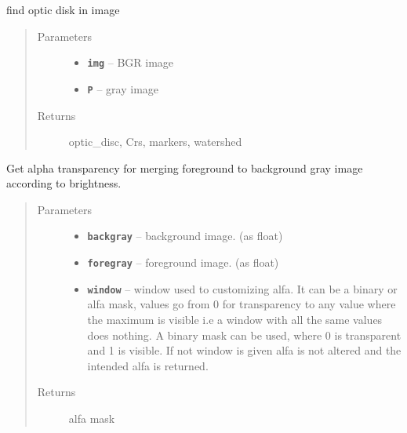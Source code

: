 \documentclass[letterpaper,10pt,english]{sphinxmanual}
\begin{document}
\begin{fulllineitems}
\label{RRtoolbox.tools:RRtoolbox.tools.segmentation.find_optic_disc}
find optic disk in image
\begin{quote}\begin{description}
\item[{Parameters}] \leavevmode\begin{itemize}
\item {} 
\textbf{\texttt{img}} -- BGR image

\item {} 
\textbf{\texttt{P}} -- gray image

\end{itemize}

\item[{Returns}] \leavevmode
optic\_disc, Crs, markers, watershed

\end{description}\end{quote}

\end{fulllineitems}


\begin{fulllineitems}
\label{RRtoolbox.tools:RRtoolbox.tools.segmentation.getBrightAlpha}
Get alpha transparency for merging foreground to background gray image according to brightness.
\begin{quote}\begin{description}
\item[{Parameters}] \leavevmode\begin{itemize}
\item {} 
\textbf{\texttt{backgray}} -- background image. (as float)

\item {} 
\textbf{\texttt{foregray}} -- foreground image. (as float)

\item {} 
\textbf{\texttt{window}} -- window used to customizing alfa. It can be a binary or alfa mask, values go from 0 for transparency
to any value where the maximum is visible i.e a window with all the same values does nothing.
A binary mask can be used, where 0 is transparent and 1 is visible.
If not window is given alfa is not altered and the intended alfa is returned.

\end{itemize}

\item[{Returns}] \leavevmode
alfa mask

\end{description}\end{quote}

\end{fulllineitems}
\end{document}
